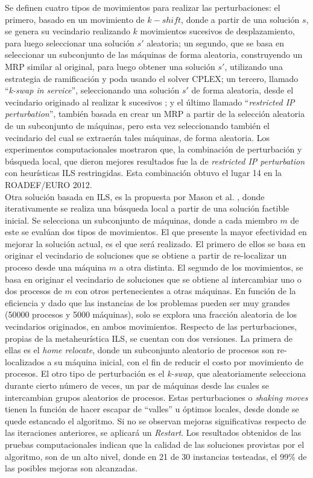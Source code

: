 \documentclass[../informe2.tex]{subfiles}
\begin{document}
Se definen cuatro tipos de movimientos para realizar las perturbaciones:
el primero, basado en un movimiento de $k-shift$, donde a partir de una solución $s$, se genera su vecindario realizando $k$ movimientos sucesivos de desplazamiento, para luego seleccionar una solución $s'$ aleatoria; un segundo, que se basa en seleccionar un subconjunto de las máquinas de forma aleatoria, construyendo un MRP similar al original, para luego obtener una solución $s'$, utilizando una estrategia de ramificación y poda usando el solver CPLEX; un tercero, llamado ``\textit{k-swap in service}'', seleccionando una solución $s'$ de forma aleatoria, desde el vecindario originado al realizar k sucesivos ; y el último llamado ``\textit{restricted IP perturbation}'', también basada en crear un MRP a partir de la selección aleatoria de un subconjunto de máquinas, pero esta vez seleccionando también el vecindario del cual se extraerán tales máquinas, de forma aleatoria.
Los experimentos computacionales mostraron que, la combinación de perturbación y búsqueda local, que dieron mejores resultados fue la de \textit{restricted IP perturbation} con heurísticas ILS restringidas. Esta combinación obtuvo el lugar 14 en la ROADEF/EURO 2012. \\

Otra solución basada en ILS, es la propuesta por Mason et al. \cite{masson2013iterated}, donde iterativamente se realiza una búsqueda local a partir de una solución factible inicial. Se selecciona un subconjunto de máquinas, donde a cada miembro $m$ de este se evalúan dos tipos de movimientos. El que presente la mayor efectividad en mejorar la solución actual, es el que será realizado. El primero de ellos se basa en originar el vecindario de soluciones que se obtiene a partir de re-localizar un proceso desde una máquina $m$ a otra distinta. El segundo de los movimientos, se basa en originar el vecindario de soluciones que se obtiene al intercambiar uno o dos procesos de $m$ con otros pertenecientes a otras máquinas. En función de la eficiencia y dado que las instancias de los problemas pueden ser muy grandes (50000 procesos y 5000 máquinas), solo se explora una fracción aleatoria de los vecindarios originados, en ambos movimientos.
Respecto de las perturbaciones, propias de la metaheurística ILS, se cuentan con dos versiones. La primera de ellas es el \textit{home relocate}, donde un subconjunto aleatorio de procesos son re-localizados a su máquina inicial, con el fin de reducir el costo por movimiento de procesos. El otro tipo de perturbación es el \textit{k-swap}, que aleatoriamente selecciona durante cierto número de veces, un par de máquinas desde las cuales se intercambian grupos aleatorios de procesos. Estas perturbaciones o \textit{shaking moves} tienen la función de hacer escapar de ``valles'' u óptimos locales, desde donde se quede estancado el algoritmo. Si no se observan mejoras significativas respecto de las iteraciones anteriores, se aplicará un \textit{Restart}. Los resultados obtenidos de las pruebas computacionales indican que la calidad de las soluciones provistas por el algoritmo, son de un alto nivel, donde en 21 de 30 instancias testeadas, el 99\% de las posibles mejoras son alcanzadas. \\
\end{document}
